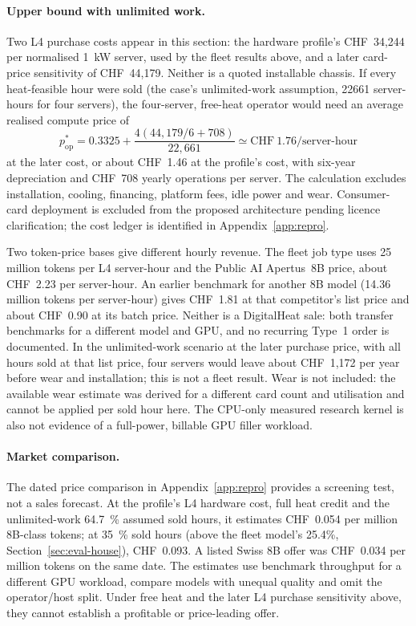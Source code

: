 \paragraph{Upper bound with unlimited work.} Two L4 purchase costs appear in this section: the
hardware profile's CHF~34,244 per normalised \qty{1}{kW} server, used by the fleet results above,
and a later card-price sensitivity of CHF~44,179. Neither is a quoted installable chassis. If every
heat-feasible hour were sold (the case's unlimited-work assumption, \num{22661} server-hours for four
servers), the four-server, free-heat operator would need an average realised compute price of
\begin{equation}
  p_{\mathrm{op}}^{*}
  =0.3325+\frac{4(44{,}179/6+708)}{22{,}661}
  \simeq \text{CHF}~1.76\text{/server-hour}
  \label{eq:operator-break-even}
\end{equation}
at the later cost, or about CHF~1.46 at the profile's cost, with six-year depreciation and CHF~708
yearly operations per server. The calculation excludes installation, cooling, financing, platform
fees, idle power and wear. Consumer-card deployment is excluded from the proposed architecture
pending licence clarification; the cost ledger is identified in Appendix~\ref{app:repro}.

Two token-price bases give different hourly revenue. The fleet job type uses \num{25} million tokens
per L4 server-hour and the Public AI Apertus~8B price, about CHF~2.23 per server-hour. An earlier
benchmark for another 8B model (\num{14.36} million tokens per server-hour) gives CHF~1.81 at that
competitor's list price and about CHF~0.90 at its batch price. Neither is a DigitalHeat sale: both
transfer benchmarks for a different model and GPU, and no recurring Type~1 order is documented. In
the unlimited-work scenario at the later purchase price, with all hours sold at that list price,
four servers would leave about CHF~1,172 per year before wear and installation; this is not a fleet
result. Wear is not included: the available wear estimate was derived for a different card count
and utilisation and cannot be applied per sold hour here. The CPU-only measured research kernel is
also not evidence of a full-power, billable GPU filler workload.

\paragraph{Market comparison.} The dated price comparison in Appendix~\ref{app:repro}
provides a screening test, not a sales
forecast. At the profile's L4 hardware cost, full heat credit and the unlimited-work \qty{64.7}{\percent} assumed
sold hours, it estimates CHF~0.054 per million 8B-class tokens; at \qty{35}{\percent} sold
hours (above the fleet model's 25.4\%, Section~\ref{sec:eval-house}), CHF~0.093. A listed Swiss 8B offer was CHF~0.034 per million tokens on the same
date. The estimates use benchmark throughput for a different GPU workload, compare models
with unequal quality and omit the operator/host split. Under free heat and the later L4
purchase sensitivity above, they cannot establish a profitable or price-leading offer.

